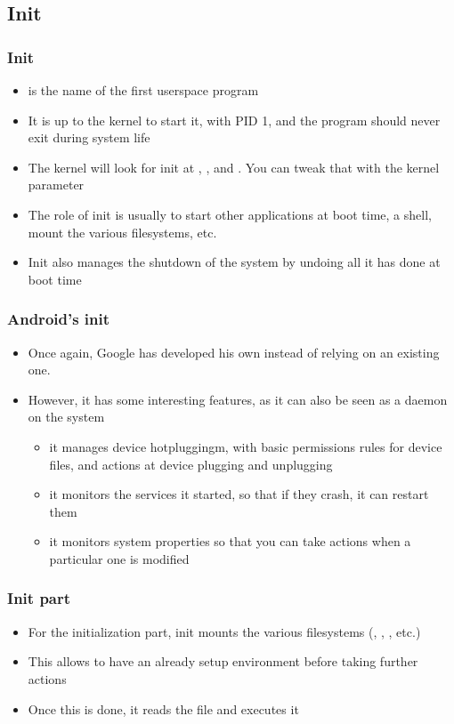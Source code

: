 \subsection{Init}
\begin{frame}
  \frametitle{Init}
  \begin{itemize}
  \item {} is the name of the first userspace program
  \item It is up to the kernel to start it, with PID 1, and the
    program should never exit during system life
  \item The kernel will look for init at ,
    ,  and . You can
    tweak that with the  kernel parameter
  \item The role of init is usually to start other applications at
    boot time, a shell, mount the various filesystems, etc.
  \item Init also manages the shutdown of the system by undoing all it
    has done at boot time
  \end{itemize}
\end{frame}

\begin{frame}
  \frametitle{Android's init}
  \begin{itemize}
  \item Once again, Google has developed his own instead of relying on
    an existing one.
  \item However, it has some interesting features, as it can also be
    seen as a daemon on the system
    \begin{itemize}
    \item it manages device hotpluggingm, with basic
      permissions rules for device files, and actions at device plugging
      and unplugging
    \item it monitors the services it started, so that if they crash,
      it can restart them
    \item it monitors system properties so that you can take
      actions when a particular one is modified
    \end{itemize}
  \end{itemize}
\end{frame}

\begin{frame}
  \frametitle{Init part}
  \begin{itemize}
  \item For the initialization part, init mounts the various
    filesystems (, , , etc.)
  \item This allows to have an already setup environment before taking
    further actions
  \item Once this is done, it reads the  file and
    executes it
  \end{itemize}
\end{frame}

